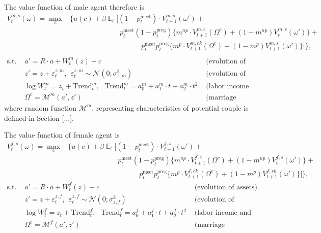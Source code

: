 \documentclass[12pt,letter]{article}
\DeclareMathOperator{\E}{\mathbb{E}}
\begin{document}
The value function of male agent therefore is
\begin{align}V^{m,s}_t(\omega) = \max\limits_{c} & \bigg\{ u(c) + \beta \E_t \Big[ (1 - p^{\text{meet}}_t)\cdot V^{m,s}_{t+1}(\omega') + \\ \nonumber
& \hspace{7em} p^{\text{meet}}_t (1-p^{\text{preg}}_t) \big\{ m^{np} \cdot V^{m,c}_{t+1}(\Omega^c) + (1-m^{np})V^{m,s}_t(\omega')\big\} + \\  \nonumber
& \hspace{10em} p^{\text{meet}}_t p^{\text{preg}}_t \big\{ m^{p} \cdot V^{m,ck}_{t+1}(\Omega^c) + (1-m^{p})V^{m,s}_{t+1}(\omega')\big\}  \Big]  \bigg\},\\  \nonumber
 \end{align}\vspace{-3em}
 \begin{align*}
 \text{s.t. \ }  &  a' = R\cdot a  + W^m_t(z) - c  & \text{ (evolution of assets)}\\
 &  z' = z + \varepsilon^{z,m}_t, \ \ \varepsilon^{z,m}_t \sim \mathcal{N}(0;\sigma_{z,m}^2) &  \text{ (evolution of productivity)}\\
  & \log W^m_t = z_t + \text{Trend}^m_t, \ \ \  \text{Trend}^m_t = a^m_0 + a^m_1\cdot t  +  a^m_2 \cdot t^2 &  \text{ (labor income and trend)}\\
  & \Omega^c = \mathcal{M}^m(a',z') &  \text{ (marriage prospectives)}
\end{align*}
where random function $\mathcal{M}^m$, representing characteristics of potential couple is defined in Section [...].

The value function of female agent is
\begin{align}V^{f,s}_t(\omega) = \max\limits_{c} & \bigg\{ u(c) + \beta \E_t \Big[ (1 - p^{\text{meet}}_t)\cdot V^{f,s}_{t+1}(\omega') + \label{single-fem} \\  \nonumber
& \hspace{7em} p^{\text{meet}}_t (1-p^{\text{preg}}_t) \big\{ m^{np} \cdot V^{f,c}_{t+1}(\Omega^c) + (1-m^{np})V^{f,s}_t(\omega')\big\} + \\  \nonumber
& \hspace{10em} p^{\text{meet}}_t p^{\text{preg}}_t \big\{ m^{p} \cdot V^{f,ck}_{t+1}(\Omega^c) + (1-m^{p})V^{f,sk}_{t+1}(\omega')\big\}  \Big]  \bigg\},
\end{align}\vspace{-3em}
\begin{align*}
 \text{s.t. \ }  &  a' = R\cdot a  + W^f_t(z) - c  & \text{ (evolution of assets)}\\
 &  z' = z + \varepsilon^{z,f}_t, \ \ \varepsilon^{z,f}_t \sim \mathcal{N}(0;\sigma_{z,f}^2) &  \text{ (evolution of productivity)}\\
  & \log W^f_t = z_t + \text{Trend}^f_t, \ \ \  \text{Trend}^f_t = a^f_0 + a^f_1\cdot t  +  a^f_2 \cdot t^2 &  \text{ (labor income and trend)}\\
  & \Omega^c = \mathcal{M}^f(a',z') &  \text{ (marriage prospectives)}
\end{align*}
\end{document}
